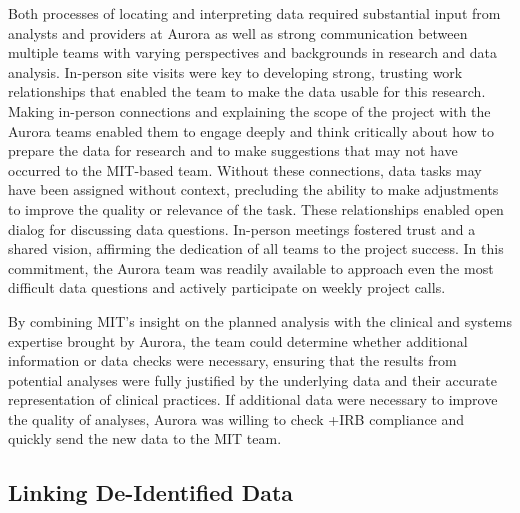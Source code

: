 \documentclass[
]{book}
\begin{document}
Both processes of locating and interpreting data required substantial input from analysts and providers at Aurora as well as strong communication between multiple teams with varying perspectives and backgrounds in research and data analysis. In-person site visits were key to developing strong, trusting work relationships that enabled the team to make the data usable for this research. Making in-person connections and explaining the scope of the project with the Aurora teams enabled them to engage deeply and think critically about how to prepare the data for research and to make suggestions that may not have occurred to the MIT-based team. Without these connections, data tasks may have been assigned without context, precluding the ability to make adjustments to improve the quality or relevance of the task. These relationships enabled open dialog for discussing data questions. In-person meetings fostered trust and a shared vision, affirming the dedication of all teams to the project success. In this commitment, the Aurora team was readily available to approach even the most difficult data questions and actively participate on weekly project calls.

By combining MIT's insight on the planned analysis with the clinical and systems expertise brought by Aurora, the team could determine whether additional information or data checks were necessary, ensuring that the results from potential analyses were fully justified by the underlying data and their accurate representation of clinical practices. If additional data were necessary to improve the quality of analyses, Aurora was willing to check +IRB\textbar{} compliance and quickly send the new data to the MIT team.

\hypertarget{linking-de-identified-data}{%
\subsection{Linking De-Identified Data}\label{linking-de-identified-data}}
\end{document}
